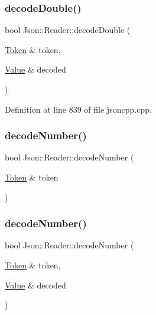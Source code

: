 \subsubsection{\texorpdfstring{decode\+Double()}{decodeDouble()}\hspace{0.1cm}{\footnotesize\ttfamily [4/4]}}
{\footnotesize\ttfamily bool Json\+::\+Reader\+::decode\+Double (\begin{DoxyParamCaption}\item[{\hyperlink{class_json_1_1_reader_1_1_token}{Token} \&}]{token,  }\item[{\hyperlink{class_json_1_1_value}{Value} \&}]{decoded }\end{DoxyParamCaption})\hspace{0.3cm}{\ttfamily [private]}}



Definition at line 839 of file jsoncpp.\+cpp.

\hypertarget{class_json_1_1_reader_a442d1f23edf0f4350f5eeab3ee3f7d46}{}\label{class_json_1_1_reader_a442d1f23edf0f4350f5eeab3ee3f7d46} 
\subsubsection{\texorpdfstring{decode\+Number()}{decodeNumber()}\hspace{0.1cm}{\footnotesize\ttfamily [1/4]}}
{\footnotesize\ttfamily bool Json\+::\+Reader\+::decode\+Number (\begin{DoxyParamCaption}\item[{\hyperlink{class_json_1_1_reader_1_1_token}{Token} \&}]{token }\end{DoxyParamCaption})\hspace{0.3cm}{\ttfamily [private]}}

\hypertarget{class_json_1_1_reader_a72f426ce3fa384d14aa10e9dd75618f0}{}\label{class_json_1_1_reader_a72f426ce3fa384d14aa10e9dd75618f0} 
\subsubsection{\texorpdfstring{decode\+Number()}{decodeNumber()}\hspace{0.1cm}{\footnotesize\ttfamily [2/4]}}
{\footnotesize\ttfamily bool Json\+::\+Reader\+::decode\+Number (\begin{DoxyParamCaption}\item[{\hyperlink{class_json_1_1_reader_1_1_token}{Token} \&}]{token,  }\item[{\hyperlink{class_json_1_1_value}{Value} \&}]{decoded }\end{DoxyParamCaption})\hspace{0.3cm}{\ttfamily [private]}}

